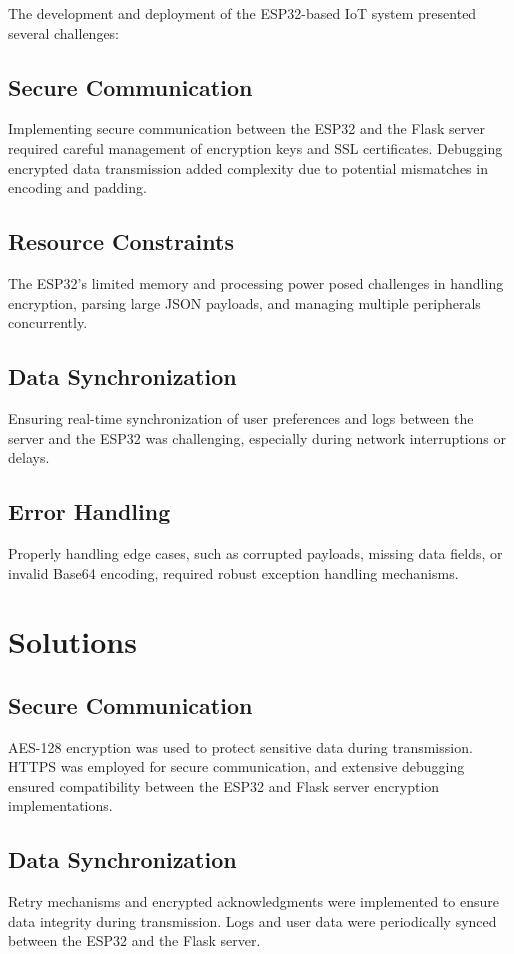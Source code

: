 \documentclass[a4paper,12pt]{report}
\begin{document}
The development and deployment of the ESP32-based IoT system presented several challenges:

\subsection{Secure Communication}
Implementing secure communication between the ESP32 and the Flask server required careful management of encryption keys and SSL certificates. Debugging encrypted data transmission added complexity due to potential mismatches in encoding and padding.

\subsection{Resource Constraints}
The ESP32's limited memory and processing power posed challenges in handling encryption, parsing large JSON payloads, and managing multiple peripherals concurrently.

\subsection{Data Synchronization}
Ensuring real-time synchronization of user preferences and logs between the server and the ESP32 was challenging, especially during network interruptions or delays.

\subsection{Error Handling}
Properly handling edge cases, such as corrupted payloads, missing data fields, or invalid Base64 encoding, required robust exception handling mechanisms.

\section{Solutions}

\subsection{Secure Communication}
AES-128 encryption was used to protect sensitive data during transmission. HTTPS was employed for secure communication, and extensive debugging ensured compatibility between the ESP32 and Flask server encryption implementations.

\subsection{Data Synchronization}
Retry mechanisms and encrypted acknowledgments were implemented to ensure data integrity during transmission. Logs and user data were periodically synced between the ESP32 and the Flask server.
\end{document}
